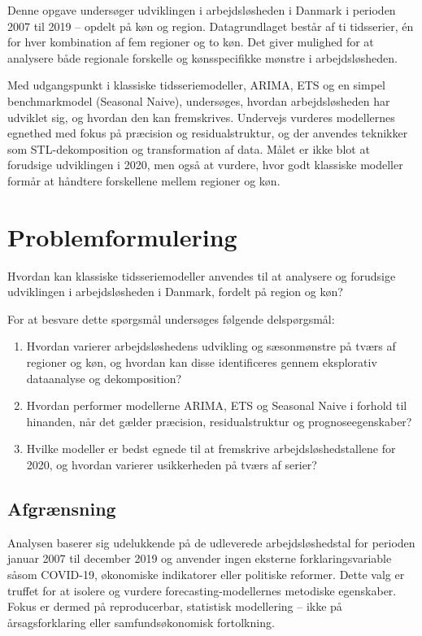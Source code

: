 \documentclass[
]{article}
\begin{document}
Denne opgave undersøger udviklingen i arbejdsløsheden i Danmark i
perioden 2007 til 2019 -- opdelt på køn og region. Datagrundlaget består
af ti tidsserier, én for hver kombination af fem regioner og to køn. Det
giver mulighed for at analysere både regionale forskelle og
kønsspecifikke mønstre i arbejdsløsheden.

Med udgangspunkt i klassiske tidsseriemodeller, ARIMA, ETS og en simpel
benchmarkmodel (Seasonal Naive), undersøges, hvordan arbejdsløsheden har
udviklet sig, og hvordan den kan fremskrives. Undervejs vurderes
modellernes egnethed med fokus på præcision og residualstruktur, og der
anvendes teknikker som STL-dekomposition og transformation af data.
Målet er ikke blot at forudsige udviklingen i 2020, men også at vurdere,
hvor godt klassiske modeller formår at håndtere forskellene mellem
regioner og køn.

\section{Problemformulering}\label{problemformulering}

Hvordan kan klassiske tidsseriemodeller anvendes til at analysere og
forudsige udviklingen i arbejdsløsheden i Danmark, fordelt på region og
køn?

For at besvare dette spørgsmål undersøges følgende delspørgsmål:

\begin{enumerate}
\def\labelenumi{\arabic{enumi}.}
\item
  Hvordan varierer arbejdsløshedens udvikling og sæsonmønstre på tværs
  af regioner og køn, og hvordan kan disse identificeres gennem
  eksplorativ dataanalyse og dekomposition?
\item
  Hvordan performer modellerne ARIMA, ETS og Seasonal Naive i forhold
  til hinanden, når det gælder præcision, residualstruktur og
  prognoseegenskaber?
\item
  Hvilke modeller er bedst egnede til at fremskrive
  arbejdsløshedstallene for 2020, og hvordan varierer usikkerheden på
  tværs af serier?
\end{enumerate}

\subsection{Afgrænsning}\label{afgruxe6nsning}

Analysen baserer sig udelukkende på de udleverede arbejdsløshedstal for
perioden januar 2007 til december 2019 og anvender ingen eksterne
forklaringsvariable såsom COVID-19, økonomiske indikatorer eller
politiske reformer. Dette valg er truffet for at isolere og vurdere
forecasting-modellernes metodiske egenskaber. Fokus er dermed på
reproducerbar, statistisk modellering -- ikke på årsagsforklaring eller
samfundsøkonomisk fortolkning.
\end{document}
